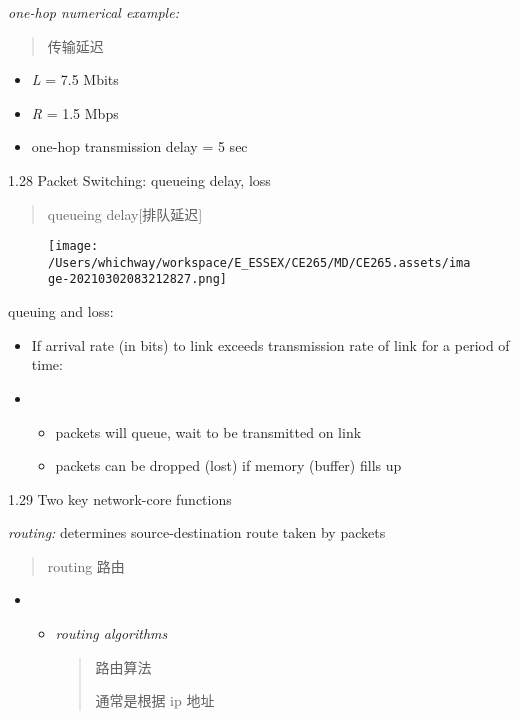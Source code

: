 \documentclass[
]{article}
\begin{document}
\emph{one-hop numerical example:}

\begin{quote}
传输延迟
\end{quote}

\begin{itemize}
\item
  \emph{L} = 7.5 Mbits
\item
  \emph{R} = 1.5 Mbps
\item
  one-hop transmission delay = 5 sec
\end{itemize}

1.28 Packet Switching: queueing delay, loss

\begin{quote}
queueing delay{[}排队延迟{]}
\end{quote}

\begin{figure}
\centering
\texttt{[image: /Users/whichway/workspace/E\_ESSEX/CE265/MD/CE265.assets/image-20210302083212827.png]}
\caption{}
\end{figure}

queuing and loss:

\begin{itemize}
\item
  If arrival rate (in bits) to link exceeds transmission rate of link
  for a period of time:
\item
  \begin{itemize}
  \item
    packets will queue, wait to be transmitted on link
  \item
    packets can be dropped (lost) if memory (buffer) fills up
  \end{itemize}
\end{itemize}

1.29 Two key network-core functions

\emph{routing:} determines source-destination route taken by packets

\begin{quote}
routing 路由
\end{quote}

\begin{itemize}
\item
  \begin{itemize}
  \item
    \emph{routing algorithms}

    \begin{quote}
    路由算法

    通常是根据 ip 地址
    \end{quote}
  \end{itemize}
\end{itemize}
\end{document}

